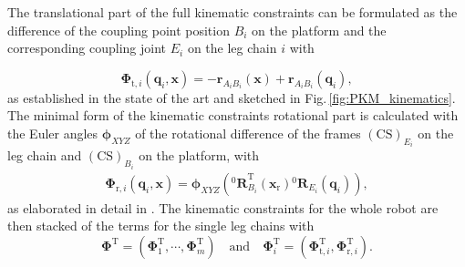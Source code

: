 \documentclass[fleqn,a4paper,10pt]{article}
\newcommand{\bm}[1]{\mathbf{#1}}
\renewcommand{\Phi}[1]{\varPhi{#1}}
\newcommand{\rotmat}[2]{{{ }^{#1}\bm{R}}_{#2}}
\newcommand{\transp}[0]{{\mathrm{T}}}
\newcommand{\ks}[1]{{(\mathrm{CS})}_{#1}}
\begin{document}
\begin{multicols}{2}
The translational part of the full kinematic constraints can be formulated as the difference of the coupling point position $B_i$ on the platform and the corresponding coupling joint $E_i$ on the leg chain $i$ with


%
\begin{equation}
\bm{\Phi}_{\mathrm{t},i}(\bm{q}_i,\bm{x}) = - \bm{r}_{A_iB_i}(\bm{x}) + \bm{r}_{A_iB_i}(\bm{q}_i),
\label{equ:kinconstrAB}
\end{equation}
%
as established in the state of the art \cite{Merlet2006} and sketched in Fig.\,\ref{fig:PKM_kinematics}.
The minimal form of the kinematic constraints rotational part is calculated with the Euler angles $\bm{\phi}_{XYZ}$ of the rotational difference of the frames $\ks{E_i}$ on the leg chain and $\ks{B_i}$ on the platform, with
%
\begin{align}
\bm{\Phi}_{\mathrm{r},i}(\bm{q}_i,\bm{x})
=
\bm{\phi}_{XYZ}\left(\rotmat{0}{B_i}^\transp (\bm{x}_{\mathrm{r}})\rotmat{0}{E_i}(\bm{q}_i)\right),
\label{equ:Phir_def_i}
\end{align}
%
as elaborated in detail in \cite{SchapplerTapOrt2019c}.
%
The kinematic constraints for the whole robot are then stacked of the terms for the single leg chains with 
%
\begin{equation}
\bm{\Phi}^\transp
=
(\bm{\Phi}_1^\transp,
\cdots,
\bm{\Phi}_m^\transp
)
\quad
\mathrm{and}
\quad
\bm{\Phi}_i^\transp=(
\bm{\Phi}_{\mathrm{t},i}^\transp, \bm{\Phi}_{\mathrm{r},i}^\transp
).
\label{equ:constr_Phi_PKM}
\end{equation}


\end{multicols}
\end{document}
